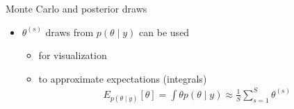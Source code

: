 \documentclass[10pt,handout]{beamer}
\begin{document}
\begin{frame}

\end{frame}

\begin{frame}

  {Monte Carlo and posterior draws}

  \begin{itemize}
  \item $\theta^{(s)}$ draws from $p(\theta \mid y)$ can be used
    \begin{itemize}
    \item<1-> for visualization
    \item<2-> to approximate expectations (integrals)
      \begin{align*}
        E_{p(\theta \mid y)}[\theta] = \int \theta p(\theta \mid y) \approx \frac{1}{S}\sum_{s=1}^{S} \theta^{(s)}
      \end{align*}
    \end{itemize}
  \end{itemize}

\end{frame}
\end{document}
